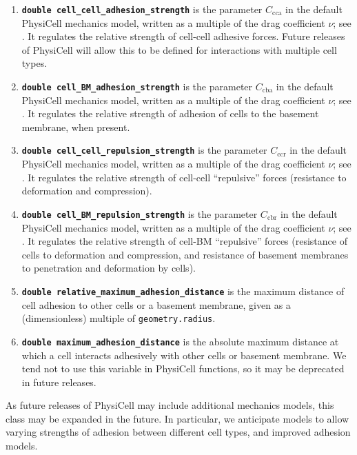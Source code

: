 \documentclass[12pt]{article}
\newcommand{\smallcode}[1]{\textbf{\texttt{#1}}}
\begin{document}
\begin{enumerate}
\item 
\smallcode{double cell\_cell\_adhesion\_strength} is the parameter 
$C_\textrm{cca}$ in the default 
PhysiCell mechanics model, written as a multiple of the drag coefficient $\nu$; see 
\cite{ref:PhysiCell}. It regulates the relative strength of cell-cell adhesive forces. Future releases of PhysiCell will allow this to be defined 
for interactions with multiple cell types. 

\item 
\smallcode{double cell\_BM\_adhesion\_strength} is the parameter $C_\textrm{cba}$ in the default 
PhysiCell mechanics model, written as a multiple of the drag coefficient $\nu$; see 
\cite{ref:PhysiCell}. It regulates the relative strength of adhesion of cells to the basement membrane, 
when present. 

\item 
\smallcode{double cell\_cell\_repulsion\_strength} is the parameter $C_\textrm{ccr}$ in the default 
PhysiCell mechanics model, written as a multiple of the drag coefficient $\nu$; see 
\cite{ref:PhysiCell}. It regulates the relative strength of cell-cell ``repulsive'' forces 
(resistance to deformation and compression). 

\item 
\smallcode{double cell\_BM\_repulsion\_strength} is the parameter $C_\textrm{cbr}$ in the default 
PhysiCell mechanics model, written as a multiple of the drag coefficient $\nu$; see 
\cite{ref:PhysiCell}. It regulates the relative strength of cell-BM ``repulsive'' forces 
(resistance of cells to deformation and compression, and resistance of basement membranes 
to penetration and deformation by cells). 

\item 
\smallcode{double relative\_maximum\_adhesion\_distance} is the maximum distance of cell adhesion 
to other cells or a basement membrane, given as a (dimensionless) multiple of \texttt{geometry.radius}. 

\item 
\smallcode{double maximum\_adhesion\_distance} is the absolute maximum distance at which a cell 
interacts adhesively with other cells or basement membrane. We tend not to use this variable 
in PhysiCell functions, so it may be deprecated in future releases. 
\end{enumerate}

As future releases of PhysiCell may include 
additional mechanics models, this class may be expanded in the future. In particular, 
we anticipate models to allow varying strengths of adhesion between different cell types, 
and improved adhesion models. 
\end{document}
